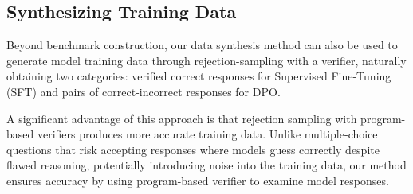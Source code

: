 




\subsection{Synthesizing Training Data}
Beyond benchmark construction, our data synthesis method can also be used to generate model training data through rejection-sampling with a verifier, naturally obtaining two categories: verified correct responses for Supervised Fine-Tuning (SFT) and pairs of correct-incorrect responses for DPO.

A significant advantage of this approach is that rejection sampling with program-based verifiers produces more accurate training data. Unlike multiple-choice questions that risk accepting responses where models guess correctly despite flawed reasoning, potentially introducing noise into the training data, our method ensures accuracy by using program-based verifier to examine model responses.

